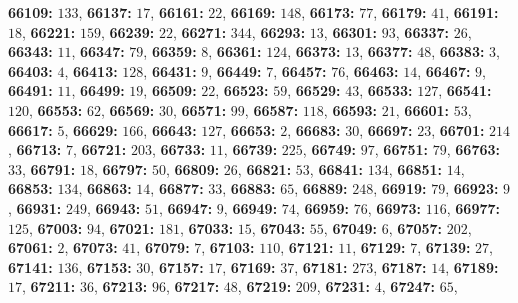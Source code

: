 \textsf{\bfseries 66109:} $133$, \textsf{\bfseries 66137:} $17$, \textsf{\bfseries 66161:} $22$, \textsf{\bfseries 66169:} $148$, \textsf{\bfseries 66173:} $77$, \textsf{\bfseries 66179:} $41$, \textsf{\bfseries 66191:} $18$, \textsf{\bfseries 66221:} $159$, \textsf{\bfseries 66239:} $22$, \textsf{\bfseries 66271:} $344$, \textsf{\bfseries 66293:} $13$, \textsf{\bfseries 66301:} $93$, \textsf{\bfseries 66337:} $26$, \textsf{\bfseries 66343:} $11$, \textsf{\bfseries 66347:} $79$, \textsf{\bfseries 66359:} $8$, \textsf{\bfseries 66361:} $124$, \textsf{\bfseries 66373:} $13$, \textsf{\bfseries 66377:} $48$, \textsf{\bfseries 66383:} $3$, \textsf{\bfseries 66403:} $4$, \textsf{\bfseries 66413:} $128$, \textsf{\bfseries 66431:} $9$, \textsf{\bfseries 66449:} $7$, \textsf{\bfseries 66457:} $76$, \textsf{\bfseries 66463:} $14$, \textsf{\bfseries 66467:} $9$, \textsf{\bfseries 66491:} $11$, \textsf{\bfseries 66499:} $19$, \textsf{\bfseries 66509:} $22$, \textsf{\bfseries 66523:} $59$, \textsf{\bfseries 66529:} $43$, \textsf{\bfseries 66533:} $127$, \textsf{\bfseries 66541:} $120$, \textsf{\bfseries 66553:} $62$, \textsf{\bfseries 66569:} $30$, \textsf{\bfseries 66571:} $99$, \textsf{\bfseries 66587:} $118$, \textsf{\bfseries 66593:} $21$, \textsf{\bfseries 66601:} $53$, \textsf{\bfseries 66617:} $5$, \textsf{\bfseries 66629:} $166$, \textsf{\bfseries 66643:} $127$, \textsf{\bfseries 66653:} $2$, \textsf{\bfseries 66683:} $30$, \textsf{\bfseries 66697:} $23$, \textsf{\bfseries 66701:} $214$, \textsf{\bfseries 66713:} $7$, \textsf{\bfseries 66721:} $203$, \textsf{\bfseries 66733:} $11$, \textsf{\bfseries 66739:} $225$, \textsf{\bfseries 66749:} $97$, \textsf{\bfseries 66751:} $79$, \textsf{\bfseries 66763:} $33$, \textsf{\bfseries 66791:} $18$, \textsf{\bfseries 66797:} $50$, \textsf{\bfseries 66809:} $26$, \textsf{\bfseries 66821:} $53$, \textsf{\bfseries 66841:} $134$, \textsf{\bfseries 66851:} $14$, \textsf{\bfseries 66853:} $134$, \textsf{\bfseries 66863:} $14$, \textsf{\bfseries 66877:} $33$, \textsf{\bfseries 66883:} $65$, \textsf{\bfseries 66889:} $248$, \textsf{\bfseries 66919:} $79$, \textsf{\bfseries 66923:} $9$, \textsf{\bfseries 66931:} $249$, \textsf{\bfseries 66943:} $51$, \textsf{\bfseries 66947:} $9$, \textsf{\bfseries 66949:} $74$, \textsf{\bfseries 66959:} $76$, \textsf{\bfseries 66973:} $116$, \textsf{\bfseries 66977:} $125$, \textsf{\bfseries 67003:} $94$, \textsf{\bfseries 67021:} $181$, \textsf{\bfseries 67033:} $15$, \textsf{\bfseries 67043:} $55$, \textsf{\bfseries 67049:} $6$, \textsf{\bfseries 67057:} $202$, \textsf{\bfseries 67061:} $2$, \textsf{\bfseries 67073:} $41$, \textsf{\bfseries 67079:} $7$, \textsf{\bfseries 67103:} $110$, \textsf{\bfseries 67121:} $11$, \textsf{\bfseries 67129:} $7$, \textsf{\bfseries 67139:} $27$, \textsf{\bfseries 67141:} $136$, \textsf{\bfseries 67153:} $30$, \textsf{\bfseries 67157:} $17$, \textsf{\bfseries 67169:} $37$, \textsf{\bfseries 67181:} $273$, \textsf{\bfseries 67187:} $14$, \textsf{\bfseries 67189:} $17$, \textsf{\bfseries 67211:} $36$, \textsf{\bfseries 67213:} $96$, \textsf{\bfseries 67217:} $48$, \textsf{\bfseries 67219:} $209$, \textsf{\bfseries 67231:} $4$, \textsf{\bfseries 67247:} $65$, 
